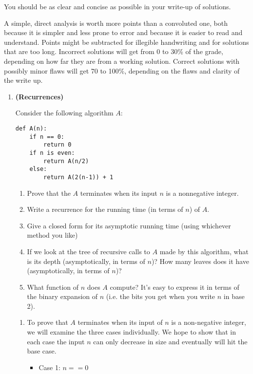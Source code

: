 \documentclass[letterpaper,11pt]{article}
\begin{document}
You should be as clear and concise as possible in your write-up of
solutions. 

A simple, direct analysis is worth more points than a
convoluted one, both because it is simpler and less prone to error and
because it is easier to read and understand. Points might be
subtracted for illegible handwriting and for solutions that are too
long. Incorrect solutions will get from 0 to 30\% of the grade,
depending on how far they are from a working solution. Correct
solutions with possibly minor flaws will get 70 to 100\%, depending on
the flaws and clarity of the write up.

\newpage 
\begin{enumerate}
    \item \textbf{(Recurrences)}
    
    Consider the following algorithm $A$:
\begin{verbatim}
def A(n):
    if n == 0:
        return 0
    if n is even:
        return A(n/2)
    else:
        return A(2(n-1)) + 1
\end{verbatim}

\begin{enumerate}
    \item Prove that the $A$ terminates when its input $n$ is a nonnegative integer.
    \item Write a recurrence for the running time (in terms of $n$) of $A$.
    \item Give a closed form for its asymptotic running time (using whichever method you like)
    \item If we look at the tree of recursive calls to $A$ made by this algorithm, what is its depth (asymptotically, in terms of $n$)? How many leaves does it have (asymptotically, in terms of $n$)?
     \item What function of $n$ does $A$ compute? It's easy to express it in terms of the binary expansion of $n$ (i.e. the bits you get when you write $n$ in base 2).
    \end{enumerate}

    
    \begin{enumerate}
        \color{teal}
        \item To prove that $A$ terminates when its input of $n$ is a 
            non-negative integer, we will examine the three cases individually. 
            We hope to show that in each case the input $n$ can only decrease
            in size and eventually will hit the base case.
            \begin{itemize}
                \item Case 1: $n == 0$


\end{itemize}
\end{enumerate}
\end{enumerate}
\end{document}
